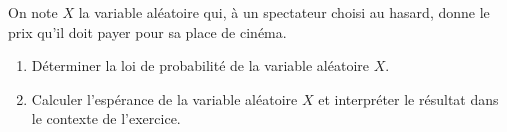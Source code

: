 \documentclass[10pt]{article}
\begin{document}
\begin{enumerate}
	On note $X$ la variable aléatoire qui, à un spectateur choisi au hasard, donne le prix qu'il doit payer pour sa place de cinéma.

	\begin{enumerate}
		\item Déterminer la loi de probabilité de la variable aléatoire $X$.
		\item Calculer l'espérance de la variable aléatoire $X$ et interpréter le résultat dans le contexte de l'exercice.
	\end{enumerate}
\end{enumerate}
\end{document}
